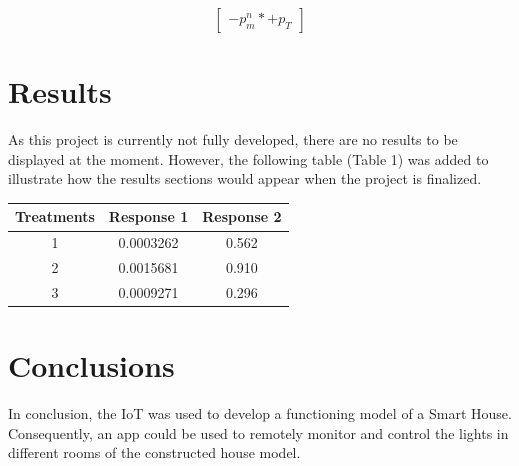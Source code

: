 \documentclass[a0,portrait]{a0poster}
\begin{document}
\begin{multicols}{2}
\begin{equation}
\begin{bmatrix}
	-p_{m}^{n}*+p_{T}
	\end{bmatrix}
\end{equation}

\color{Navy} 
\section*{Results}
As this project is currently not fully developed, there are no results to be displayed at the moment. However, the following table (Table 1) was added to illustrate how the results sections would appear when the project is finalized.

\color{Black}
\begin{center}
 \label{table_results}
\begin{tabular}{c | c | c }
\hline 
Treatments & Response 1 & Response 2 \\
\hline
1 & 0.0003262 & 0.562 \\
2 & 0.0015681 & 0.910 \\
3 & 0.0009271 & 0.296 \\
\hline
\end{tabular}
\end{center}



\color{SaddleBrown} %

\section*{Conclusions}
\Large

In conclusion, the IoT was used to develop a functioning model of a Smart House. Consequently, an app could be used to remotely monitor and control the lights in different rooms of the constructed house model.

\color{DarkSlateGray} %


\nocite{*} %


\end{multicols}
\end{document}
